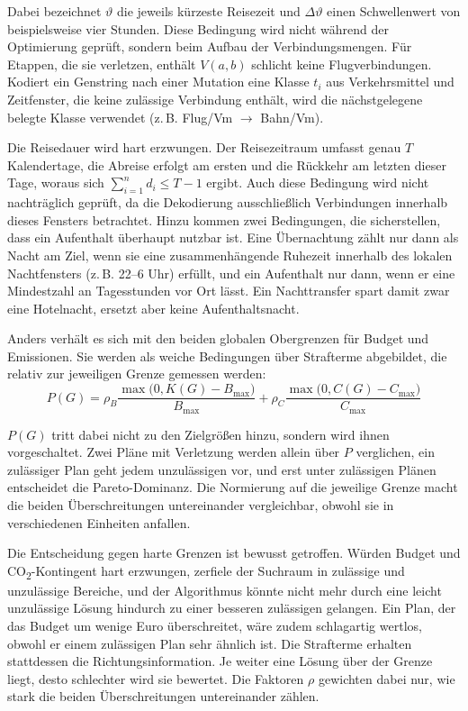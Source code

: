 Dabei bezeichnet $\vartheta$ die jeweils kürzeste Reisezeit und $\Delta\vartheta$ einen Schwellenwert von beispielsweise vier Stunden. Diese Bedingung wird nicht während der Optimierung geprüft, sondern beim Aufbau der Verbindungsmengen. Für Etappen, die sie verletzen, enthält $V(a,b)$ schlicht keine Flugverbindungen. Kodiert ein Genstring nach einer Mutation eine Klasse $t_i$ aus Verkehrsmittel und Zeitfenster, die keine zulässige Verbindung enthält, wird die nächstgelegene belegte Klasse verwendet (z.\,B. Flug/Vm $\rightarrow$ Bahn/Vm).

Die Reisedauer wird hart erzwungen. Der Reisezeitraum umfasst genau $T$ Kalendertage, die Abreise erfolgt am ersten und die Rückkehr am letzten dieser Tage, woraus sich $\sum_{i=1}^{n} d_i \leq T - 1$ ergibt. Auch diese Bedingung wird nicht nachträglich geprüft, da die Dekodierung ausschließlich Verbindungen innerhalb dieses Fensters betrachtet. Hinzu kommen zwei Bedingungen, die sicherstellen, dass ein Aufenthalt überhaupt nutzbar ist. Eine Übernachtung zählt nur dann als Nacht am Ziel, wenn sie eine zusammenhängende Ruhezeit innerhalb des lokalen Nachtfensters (z.\,B. 22--6 Uhr) erfüllt, und ein Aufenthalt nur dann, wenn er eine Mindestzahl an Tagesstunden vor Ort lässt. Ein Nachttransfer spart damit zwar eine Hotelnacht, ersetzt aber keine Aufenthaltsnacht.

Anders verhält es sich mit den beiden globalen Obergrenzen für Budget und Emissionen. Sie werden als weiche Bedingungen über Strafterme abgebildet, die relativ zur jeweiligen Grenze gemessen werden:
\begin{equation}
P(G) = \rho_B \frac{\max\!\big(0, K(G) - B_{\max}\big)}{B_{\max}} + \rho_C \frac{\max\!\big(0, C(G) - C_{\max}\big)}{C_{\max}}
\end{equation}

$P(G)$ tritt dabei nicht zu den Zielgrößen hinzu, sondern wird ihnen vorgeschaltet. Zwei Pläne mit Verletzung werden allein über $P$ verglichen, ein zulässiger Plan geht jedem unzulässigen vor, und erst unter zulässigen Plänen entscheidet die Pareto-Dominanz. Die Normierung auf die jeweilige Grenze macht die beiden Überschreitungen untereinander vergleichbar, obwohl sie in verschiedenen Einheiten anfallen.

Die Entscheidung gegen harte Grenzen ist bewusst getroffen. Würden Budget und CO\textsubscript{2}-Kontingent hart erzwungen, zerfiele der Suchraum in zulässige und unzulässige Bereiche, und der Algorithmus könnte nicht mehr durch eine leicht unzulässige Lösung hindurch zu einer besseren zulässigen gelangen. Ein Plan, der das Budget um wenige Euro überschreitet, wäre zudem schlagartig wertlos, obwohl er einem zulässigen Plan sehr ähnlich ist. Die Strafterme erhalten stattdessen die Richtungsinformation. Je weiter eine Lösung über der Grenze liegt, desto schlechter wird sie bewertet. Die Faktoren $\rho$ gewichten dabei nur, wie stark die beiden Überschreitungen untereinander zählen.
